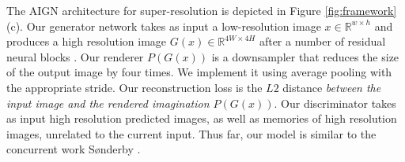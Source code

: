 \documentclass[10pt,twocolumn,letterpaper]{article}
\begin{document}
\begin{bibunit}[ieee]
The AIGN architecture for super-resolution is depicted in Figure \ref{fig:framework} (c). 
Our generator network takes as input a low-resolution image $x \in \mathbb{R}^{w \times h}$ and produces a high resolution image $G(x)\in \mathbb{R}^{4W \times 4H}$ after a number of residual neural blocks \cite{he2016deep}.  Our renderer $P(G(x))$  is a downsampler that reduces the size of the output image by four times. We implement it using average pooling with the appropriate stride. Our reconstruction loss is the $L2$ distance \textit{between the input image and the rendered imagination $P(G(x))$}. 
Our discriminator  takes as input high resolution predicted images, as well as memories of high resolution images, unrelated to the current input.  Thus far, our model is similar to the concurrent work S{\o}nderby \etal\cite{sonderby2014apparent}.  


\end{bibunit}
\end{document}
